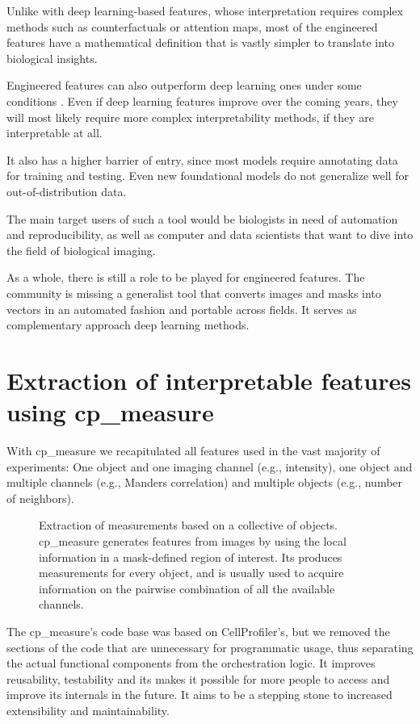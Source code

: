 \documentclass{article}
\begin{document}
Unlike with deep learning-based features, whose interpretation requires complex methods such as counterfactuals or attention maps, most of the engineered features have a mathematical definition that is vastly simpler to translate into biological insights.

Engineered features can also outperform deep learning ones under some conditions \citep{tangMorphologicalProfilingDrug2024}. Even if deep learning features improve over the coming years, they will most likely require more complex interpretability methods, if they are interpretable at all.

It also has a higher barrier of entry, since most models require annotating data for training and testing. Even new foundational models do not generalize well for out-of-distribution data.

The main target users of such a tool would be biologists in need of automation and reproducibility, as well as computer and data scientists that want to dive into the field of biological imaging.

As a whole, there is still a role to be played for engineered features. The community is missing a generalist tool that converts images and masks into vectors in an automated fashion and portable across fields. It serves as complementary approach deep learning methods.
\section{Extraction of interpretable features using cp\_measure}
\label{sec:org5633614}
With cp\_measure we recapitulated all features used in the vast majority of experiments: One object and one imaging channel (e.g., intensity), one object and multiple channels (e.g., Manders correlation) and multiple objects (e.g., number of neighbors). 

\begin{figure}[htbp]
\centering

\caption{\label{fig:orgea7e72a}Extraction of measurements based on a collective of objects. cp\_measure generates features from images by using the local information in a mask-defined region of interest. Its produces measurements for every object, and is usually used to acquire information on the pairwise combination of all the available channels.}
\end{figure}

The cp\_measure's code base was based on CellProfiler's, but we removed the sections of the code that are unnecessary for programmatic usage, thus separating the actual functional components from the orchestration logic. It improves reusability, testability and its makes it possible for more people to access and improve its internals in the future. It aims to be a stepping stone to increased extensibility and maintainability.
\end{document}
